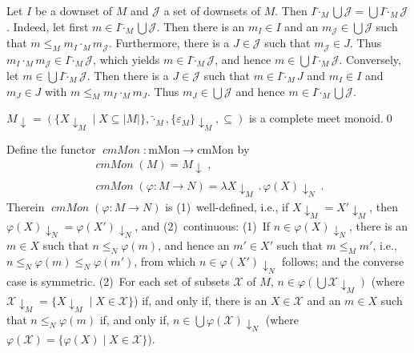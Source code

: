\documentclass[english]{notes}
\newcommand{\category}[1]{\mathrm{#1}}
\newcommand{\mMoncat}{\category{mMon}}
\newcommand{\cmMoncat}{\category{cmMon}}
\newcommand{\functor}[1]{\mathit{#1}}
\DeclareMathOperator{\cmMonfun}{\functor{cmMon}}
\newcommand{\mtimes}[1]{\mathbin{\tilde{\cdot}_{#1}}}
\newcommand{\downset}[2]{#1{\downarrow_{#2}}}
\begin{document}
Let $I$ be a downset of $M$ and $\mathcal{J}$ a set of downsets of
$M$.  Then
$I \mtimes{M} \bigcup \mathcal{J} = \bigcup I \mtimes{M} \mathcal{J}$.
Indeed, let first $m \in I \mtimes{M} \bigcup \mathcal{J}$.  Then
there is an $m_I \in I$ and an
$m_{\mathcal{J}} \in \bigcup \mathcal{J}$ such that
$m \leq_M m_I \cdot_M m_{\mathcal{J}}$.  Furthermore, there is a
$J \in \mathcal{J}$ such that $m_{\mathcal{J}} \in J$.  Thus
$m_I \cdot_M m_{\mathcal{J}} \in I \mtimes{M} \mathcal{J}$, which
yields $m \in I \mtimes{M} \mathcal{J}$, and hence
$m \in \bigcup I \mtimes{M} \mathcal{J}$.  Conversely, let
$m \in \bigcup I \mtimes{M} \mathcal{J}$.  Then there is a
$J \in \mathcal{J}$ such that $m \in I \mtimes{M} J$ and $m_I \in I$
and $m_J \in J$ with $m \leq_M m_I \cdot_M m_J$.  Thus
$m_J \in \bigcup \mathcal{J}$ and hence
$m \in I \mtimes{M} \bigcup \mathcal{J}$.

\begin{lemma}
$\downset{M}{} = (\{ \downset{X}{M} \mid X \subseteq |M| \},
\mtimes{M}, \downset{\{ \varepsilon_M \}}{M}, {\subseteq})$
is a complete meet monoid.\qed
\end{lemma}

Define the functor $\cmMonfun : \mMoncat \to \cmMoncat$ by
%
\begin{gather*}
  \cmMonfun(M) = \downset{M}{}
\ \text{,}\\
  \cmMonfun(\varphi : M \to N) = \lambda \downset{X}{M} \,.\, \downset{\varphi(X)}{N}
\ \text{.}
\end{gather*}
%
Therein $\cmMonfun(\varphi : M \to N)$ is (1)~well-defined, i.e., if
$\downset{X}{M} = \downset{X'}{M}$, then
$\downset{\varphi(X)}{N} = \downset{\varphi(X')}{N}$, and
(2)~continuous: (1)~If $n \in \downset{\varphi(X)}{N}$, there is an
$m \in X$ such that $n \leq_N \varphi(m)$, and hence an $m' \in X'$ such
that $m \leq_M m'$, i.e., $n \leq_N \varphi(m) \leq_N \varphi(m')$, from
which $n \in \downset{\varphi(X')}{N}$ follows; and the converse case is
symmetric. (2)~For each set of subsets $\mathcal{X}$ of $M$,
$n \in \varphi(\bigcup \downset{\mathcal{X}}{M})$ (where
$\downset{\mathcal{X}}{M} = \{ \downset{X}{M} \mid X \in \mathcal{X}
\}$)
if, and only if, there is an $X \in \mathcal{X}$ and an $m \in X$ such
that $n \leq_N \varphi(m)$ if, and only if,
$n \in \bigcup \downset{\varphi(\mathcal{X})}{N}$ (where
$\varphi(\mathcal{X}) = \{ \varphi(X) \mid X \in \mathcal{X} \}$).
\end{document}
